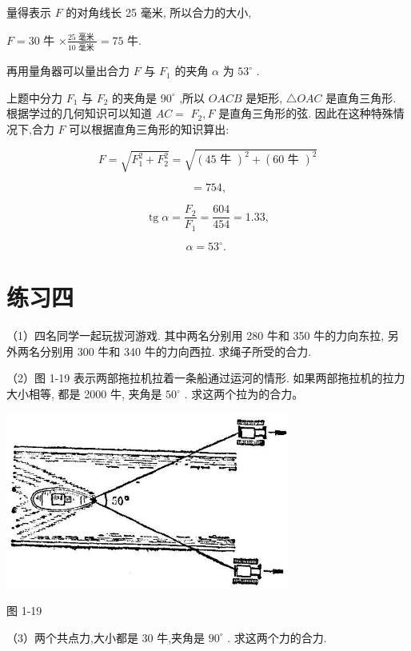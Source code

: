 \documentclass[10pt]{article}
\begin{document}
量得表示 \(F\) 的对角线长 25 毫米, 所以合力的大小,

\(F = {30}\) 牛 \(\times \frac{{25}\text{ 毫米 }}{{10}\text{ 毫米 }} = {75}\) 牛.

再用量角器可以量出合力 \(F\) 与 \({F}_{1}\) 的夹角 \(\alpha\) 为 \({53}^{ \circ }\) .

上题中分力 \({F}_{1}\) 与 \({F}_{2}\) 的夹角是 \({90}^{ \circ }\) ,所以 \({OACB}\) 是矩形, \(\bigtriangleup {OAC}\) 是直角三角形. 根据学过的几何知识可以知道 \({AC} =\) \({F}_{2},F\) 是直角三角形的弦. 因此在这种特殊情况下,合力 \(F\) 可以根据直角三角形的知识算出:

\[
F = \sqrt{{F}_{1}^{2} + {F}_{2}^{2}} = \sqrt{{\left( {45}\text{ 牛 }\right) }^{2} + {\left( {60}\text{ 牛 }\right) }^{2}}
\]

\[
= {754}\text{,}
\]

\[
\operatorname{tg}\alpha = \frac{{F}_{2}}{{F}_{1}} = \frac{604}{454} = {1.33},
\]

\[
\alpha = {53}^{ \circ }\text{. }
\]

\section*{练习四}

（1）四名同学一起玩拔河游戏. 其中两名分别用 280 牛和 350 牛的力向东拉, 另外两名分别用 300 牛和 340 牛的力向西拉. 求绳子所受的合力.

（2）图 1-19 表示两部拖拉机拉着一条船通过运河的情形. 如果两部拖拉机的拉力大小相等, 都是 2000 牛, 夹角是 \({50}^{ \circ }\) . 求这两个拉为的合力。

\begin{center}
\includegraphics[max width=0.7\textwidth]{images/01912d55-147c-70aa-b0e0-1782a122f948_33_752107.jpg}
\end{center}

图 1-19

（3）两个共点力,大小都是 30 牛,夹角是 \({90}^{ \circ }\) . 求这两个力的合力.
\end{document}
